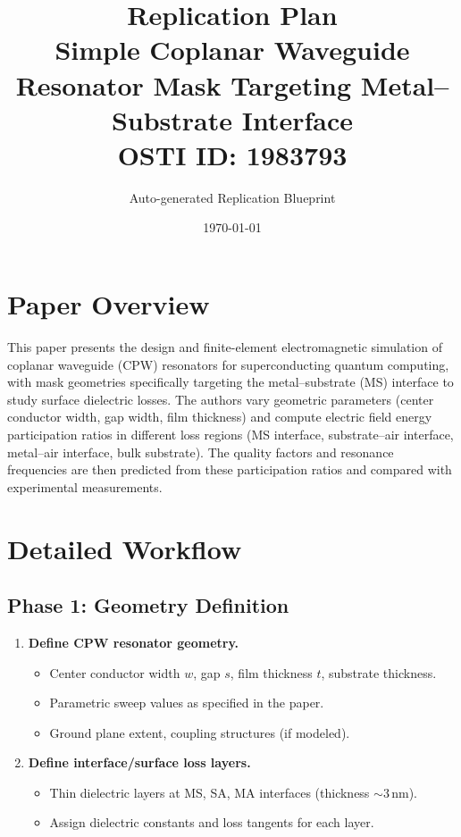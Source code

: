 \documentclass[11pt,a4paper]{article}
\title{\textbf{Replication Plan}\\[0.5em]
\large Simple Coplanar Waveguide Resonator Mask Targeting Metal--Substrate Interface\\[0.3em]
\normalsize OSTI ID: 1983793}
\author{Auto-generated Replication Blueprint}
\date{\today}
\begin{document}
\maketitle
\tableofcontents
\newpage

\section{Paper Overview}
This paper presents the design and finite-element electromagnetic simulation of coplanar waveguide (CPW) resonators for superconducting quantum computing, with mask geometries specifically targeting the metal--substrate (MS) interface to study surface dielectric losses. The authors vary geometric parameters (center conductor width, gap width, film thickness) and compute electric field energy participation ratios in different loss regions (MS interface, substrate--air interface, metal--air interface, bulk substrate). The quality factors and resonance frequencies are then predicted from these participation ratios and compared with experimental measurements.

\section{Detailed Workflow}

\subsection{Phase 1: Geometry Definition}
\begin{enumerate}[label=\textbf{1.\arabic*}]
  \item \textbf{Define CPW resonator geometry.}
    \begin{itemize}
      \item Center conductor width $w$, gap $s$, film thickness $t$, substrate thickness.
      \item Parametric sweep values as specified in the paper.
      \item Ground plane extent, coupling structures (if modeled).
    \end{itemize}
  \item \textbf{Define interface/surface loss layers.}
    \begin{itemize}
      \item Thin dielectric layers at MS, SA, MA interfaces (thickness $\sim 3$\,nm).
      \item Assign dielectric constants and loss tangents for each layer.
    \end{itemize}
\end{enumerate}
\end{document}
